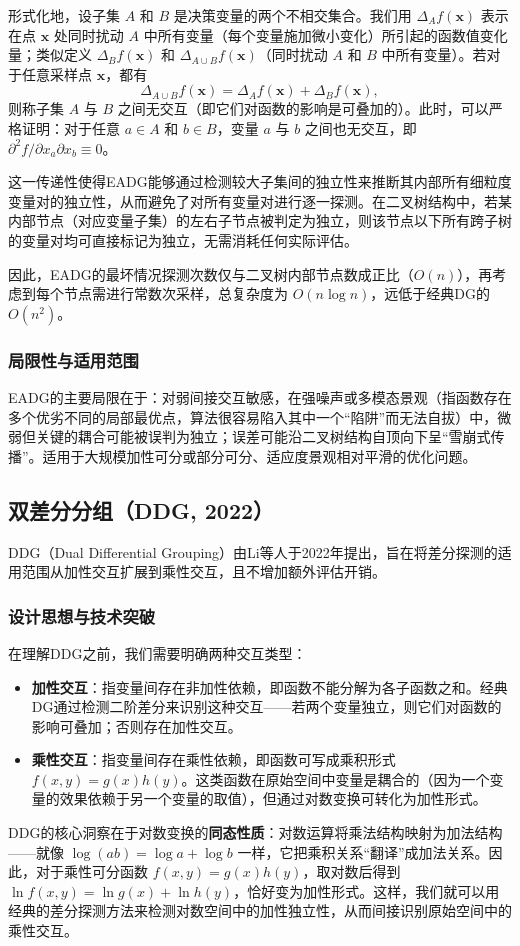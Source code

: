 形式化地，设子集 $A$ 和 $B$ 是决策变量的两个不相交集合。我们用 $\Delta_A f(\mathbf{x})$ 表示在点 $\mathbf{x}$ 处同时扰动 $A$ 中所有变量（每个变量施加微小变化）所引起的函数值变化量；类似定义 $\Delta_B f(\mathbf{x})$ 和 $\Delta_{A\cup B} f(\mathbf{x})$（同时扰动 $A$ 和 $B$ 中所有变量）。若对于任意采样点 $\mathbf{x}$，都有
\[
\Delta_{A\cup B} f(\mathbf{x}) = \Delta_A f(\mathbf{x}) + \Delta_B f(\mathbf{x}),
\]
则称子集 $A$ 与 $B$ 之间无交互（即它们对函数的影响是可叠加的）。此时，可以严格证明：对于任意 $a \in A$ 和 $b \in B$，变量 $a$ 与 $b$ 之间也无交互，即 $\partial^2 f / \partial x_a \partial x_b \equiv 0$。

这一传递性使得EADG能够通过检测较大子集间的独立性来推断其内部所有细粒度变量对的独立性，从而避免了对所有变量对进行逐一探测。在二叉树结构中，若某内部节点（对应变量子集）的左右子节点被判定为独立，则该节点以下所有跨子树的变量对均可直接标记为独立，无需消耗任何实际评估。

因此，EADG的最坏情况探测次数仅与二叉树内部节点数成正比（$O(n)$），再考虑到每个节点需进行常数次采样，总复杂度为 $O(n \log n)$，远低于经典DG的 $O(n^2)$。

\subsubsection{局限性与适用范围}
EADG的主要局限在于：对弱间接交互敏感，在强噪声或多模态景观（指函数存在多个优劣不同的局部最优点，算法很容易陷入其中一个“陷阱”而无法自拔）中，微弱但关键的耦合可能被误判为独立；误差可能沿二叉树结构自顶向下呈“雪崩式传播”。适用于大规模加性可分或部分可分、适应度景观相对平滑的优化问题。

\subsection{双差分分组（DDG, 2022）}
DDG（Dual Differential Grouping）由Li等人于2022年提出，旨在将差分探测的适用范围从加性交互扩展到乘性交互，且不增加额外评估开销。

\subsubsection{设计思想与技术突破}
在理解DDG之前，我们需要明确两种交互类型：
\begin{itemize}
    \item \textbf{加性交互}：指变量间存在非加性依赖，即函数不能分解为各子函数之和。经典DG通过检测二阶差分来识别这种交互——若两个变量独立，则它们对函数的影响可叠加；否则存在加性交互。
    \item \textbf{乘性交互}：指变量间存在乘性依赖，即函数可写成乘积形式 $f(x,y)=g(x)h(y)$。这类函数在原始空间中变量是耦合的（因为一个变量的效果依赖于另一个变量的取值），但通过对数变换可转化为加性形式。
\end{itemize}
DDG的核心洞察在于对数变换的\textbf{同态性质}：对数运算将乘法结构映射为加法结构——就像 $\log(ab) = \log a + \log b$ 一样，它把乘积关系“翻译”成加法关系。因此，对于乘性可分函数 $f(x,y)=g(x)h(y)$，取对数后得到 $\ln f(x,y)=\ln g(x)+\ln h(y)$，恰好变为加性形式。这样，我们就可以用经典的差分探测方法来检测对数空间中的加性独立性，从而间接识别原始空间中的乘性交互。

